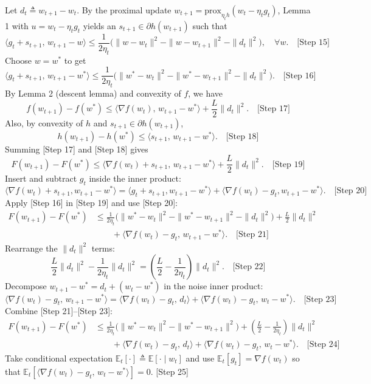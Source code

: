 \documentclass{article}
\newcommand{\prox}{\mathrm{prox}}
\newcommand{\E}{\mathbb{E}}
\begin{document}
Let $d_t \triangleq w_{t+1}-w_t$. By the proximal update
$w_{t+1} = \prox_{\eta_t h}(w_t - \eta_t g_t)$, Lemma 1 with $u = w_t - \eta_t g_t$ yields an $s_{t+1}\in \partial h(w_{t+1})$ such that
\[
\langle g_t + s_{t+1},\, w_{t+1} - w\rangle \le \frac{1}{2\eta_t}\Big(\|w - w_t\|^2 - \|w - w_{t+1}\|^2 - \|d_t\|^2\Big), \quad \forall w. \quad \text{[Step 15]}
\]
Choose $w = w^*$ to get
\[
\langle g_t + s_{t+1},\, w_{t+1} - w^*\rangle \le \frac{1}{2\eta_t}\Big(\|w^* - w_t\|^2 - \|w^* - w_{t+1}\|^2 - \|d_t\|^2\Big). \quad \text{[Step 16]}
\]
By Lemma 2 (descent lemma) and convexity of $f$, we have
\[
f(w_{t+1}) - f(w^*) \le \langle \nabla f(w_t),\, w_{t+1} - w^*\rangle + \frac{L}{2}\|d_t\|^2. \quad \text{[Step 17]}
\]
Also, by convexity of $h$ and $s_{t+1} \in \partial h(w_{t+1})$,
\[
h(w_{t+1}) - h(w^*) \le \langle s_{t+1},\, w_{t+1} - w^*\rangle. \quad \text{[Step 18]}
\]
Summing [Step 17] and [Step 18] gives
\[
F(w_{t+1}) - F(w^*) \le \langle \nabla f(w_t) + s_{t+1},\, w_{t+1} - w^*\rangle + \frac{L}{2}\|d_t\|^2. \quad \text{[Step 19]}
\]
Insert and subtract $g_t$ inside the inner product:
\[
\langle \nabla f(w_t) + s_{t+1}, w_{t+1} - w^*\rangle 
= \langle g_t + s_{t+1}, w_{t+1} - w^*\rangle + \langle \nabla f(w_t) - g_t, w_{t+1} - w^*\rangle. \quad \text{[Step 20]}
\]
Apply [Step 16] in [Step 19] and use [Step 20]:
\begin{align*}
F(w_{t+1}) - F(w^*) 
&\le \frac{1}{2\eta_t}\Big(\|w^* - w_t\|^2 - \|w^* - w_{t+1}\|^2 - \|d_t\|^2\Big) + \frac{L}{2}\|d_t\|^2 \\
&\qquad + \langle \nabla f(w_t) - g_t,\, w_{t+1} - w^*\rangle. \quad \text{[Step 21]}
\end{align*}
Rearrange the $\|d_t\|^2$ terms:
\[
\frac{L}{2}\|d_t\|^2 - \frac{1}{2\eta_t}\|d_t\|^2 = \left(\frac{L}{2} - \frac{1}{2\eta_t}\right)\|d_t\|^2. \quad \text{[Step 22]}
\]
Decompose $w_{t+1} - w^* = d_t + (w_t - w^*)$ in the noise inner product:
\[
\langle \nabla f(w_t) - g_t,\, w_{t+1} - w^*\rangle 
= \langle \nabla f(w_t) - g_t,\, d_t\rangle + \langle \nabla f(w_t) - g_t,\, w_t - w^*\rangle. \quad \text{[Step 23]}
\]
Combine [Step 21]--[Step 23]:
\begin{align*}
F(w_{t+1}) - F(w^*)
&\le \frac{1}{2\eta_t}\Big(\|w^* - w_t\|^2 - \|w^* - w_{t+1}\|^2\Big) + \left(\frac{L}{2} - \frac{1}{2\eta_t}\right)\|d_t\|^2 \\
&\qquad + \langle \nabla f(w_t) - g_t,\, d_t\rangle + \langle \nabla f(w_t) - g_t,\, w_t - w^*\rangle. \quad \text{[Step 24]}
\end{align*}
Take conditional expectation $\E_t[\cdot] \triangleq \E[\cdot \mid w_t]$ and use $\E_t[g_t] = \nabla f(w_t)$ so that $\E_t[\langle \nabla f(w_t) - g_t,\, w_t - w^*\rangle]=0$. [Step 25]
\end{document}
